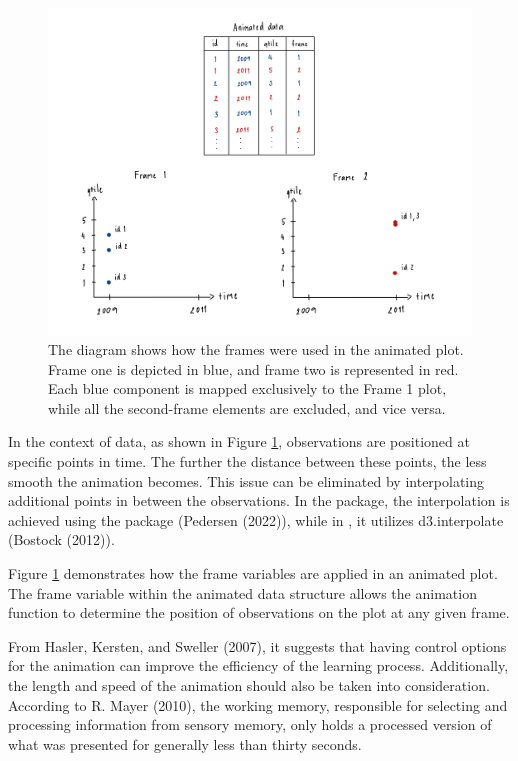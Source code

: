 \begin{figure}

{\centering \includegraphics[width=1\linewidth]{figures/animated-diagram} 

}

\caption{The diagram shows how the frames were used in the animated plot. Frame one is depicted in blue, and frame two is represented in red. Each blue component is mapped exclusively to the Frame 1 plot, while all the second-frame elements are excluded, and vice versa.}\label{fig:animated-diagram}
\end{figure}

In the context of data, as shown in Figure \ref{fig:animated-diagram}, observations are positioned at specific points in time. The further the distance between these points, the less smooth the animation becomes. This issue can be eliminated by interpolating additional points in between the observations. In the  package, the interpolation is achieved using the  package (Pedersen (2022)), while in , it utilizes d3.interpolate (Bostock (2012)).

Figure \ref{fig:animated-diagram} demonstrates how the frame variables are applied in an animated plot. The frame variable within the animated data structure allows the animation function to determine the position of observations on the plot at any given frame.

From Hasler, Kersten, and Sweller (2007), it suggests that having control options for the animation can improve the efficiency of the learning process. Additionally, the length and speed of the animation should also be taken into consideration. According to R. Mayer (2010), the working memory, responsible for selecting and processing information from sensory memory, only holds a processed version of what was presented for generally less than thirty seconds.

